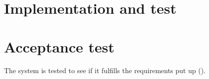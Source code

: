 \chapter{ Implementation and test} \label{chap:implem}
\chapter{Acceptance test} \label{chap:acceptanceTest}
The system is tested to see if it fulfills the requirements put up ().

